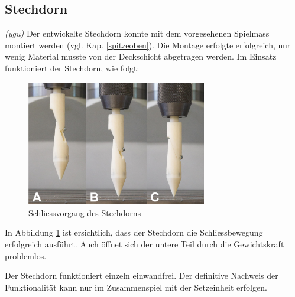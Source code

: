 \subsection{Stechdorn}
\textit{(ygu)} Der entwickelte Stechdorn konnte mit dem vorgesehenen Spielmass montiert werden (vgl. Kap. \ref{spitzeoben}). Die Montage erfolgte erfolgreich, nur wenig Material musste von der Deckschicht abgetragen werden. Im Einsatz funktioniert der Stechdorn, wie folgt:
\begin{figure}[H]
	\includegraphics[draft=false,width=0.7\textwidth]{Illustrationen/7-Inbetriebnahme_und_Kalibration/inbet_stechdorn.jpg}
	\caption{Schliessvorgang des Stechdorns}
	\label{fig:inbet_stechdorn}
\end{figure}
In Abbildung \ref{fig:inbet_stechdorn} ist ersichtlich, dass der Stechdorn die Schliessbewegung erfolgreich ausführt. Auch öffnet sich der untere Teil durch die Gewichtskraft problemlos.
\newline

Der Stechdorn funktioniert einzeln einwandfrei. Der definitive Nachweis der Funktionalität kann nur im Zusammenspiel mit der Setzeinheit erfolgen.